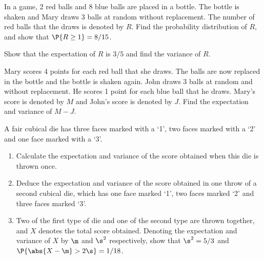 \begin{problem}
    In a game, 2 red balls and 8 blue balls are placed in a bottle. The bottle is shaken and Mary draws 3 balls at random without replacement. The number of red balls that the draws is denoted by $R$. Find the probability distribution of $R$, and show that $\P{R \geq 1} = 8/15$.

    Show that the expectation of $R$ is $3/5$ and find the variance of $R$.

    Mary scores 4 points for each red ball that she draws. The balls are now replaced in the bottle and the bottle is shaken again. John draws 3 balls at random and without replacement. He scores 1 point for each blue ball that he draws. Mary's score is denoted by $M$ and John's score is denoted by $J$. Find the expectation and variance of $M-J$.
\end{problem}

\begin{problem}[\chili]
    A fair cubical die has three faces marked with a `1', two faces marked with a `2' and one face marked with a `3'.

    \begin{enumerate}
        \item Calculate the expectation and variance of the score obtained when this die is thrown once.
        \item Deduce the expectation and variance of the score obtained in one throw of a second cubical die, which has one face marked `1', two faces marked `2' and three faces marked `3'.
        \item Two of the first type of die and one of the second type are thrown together, and $X$ denotes the total score obtained. Denoting the expectation and variance of $X$ by $\m$ and $\s^2$ respectively, show that $\s^2 = 5/3$ and $\P{\abs{X - \m} > 2\s} = 1/18$.
    \end{enumerate}
\end{problem}